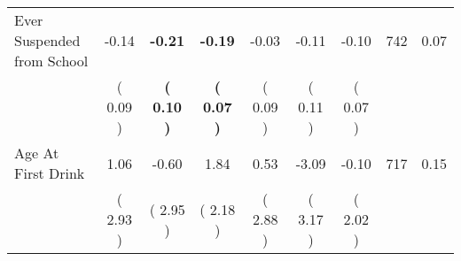 \begin{tabular}{lcccccccc}
Ever Suspended from School &     -0.14 & \textbf{    -0.21} & \textbf{    -0.19} &     -0.03 &     -0.11 &     -0.10 & 742 &       0.07 \\ 
 & (     0.09 ) & \textbf{(     0.10 )} & \textbf{(     0.07 )} & (     0.09 ) & (     0.11 ) & (     0.07 ) & \\
Age At First Drink &      1.06 &     -0.60 &      1.84 &      0.53 &     -3.09 &     -0.10 & 717 &       0.15 \\ 
 & (     2.93 ) & (     2.95 ) & (     2.18 ) & (     2.88 ) & (     3.17 ) & (     2.02 ) & \\
\bottomrule
\end{tabular}
